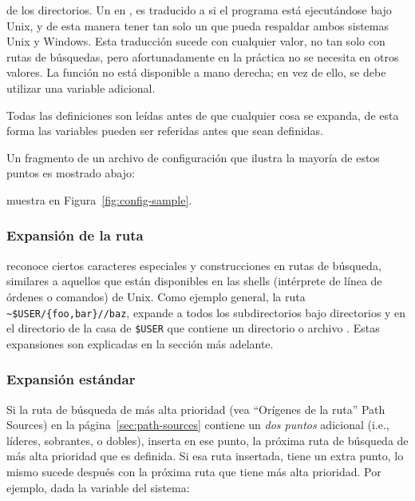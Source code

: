 \documentclass{article}
\begin{document}
\begin{itemize*}
			de los directorios.  Un \samp{;} en \var{:}, es
			traducido a \samp{:} si el programa está
			ejecutándose bajo Unix, y de esta manera tener
			tan solo un  que pueda respaldar
			ambos sistemas Unix y Windows. Esta traducción
			sucede con cualquier valor, no tan solo con
			rutas de búsquedas, pero afortunadamente en la
			práctica \samp{;} no se necesita en otros
			valores.  La función  no está disponible  a mano derecha;
			en vez de ello, se debe utilizar una variable
			adicional.  
		\item
			Todas las definiciones son leídas
			antes de que cualquier cosa se
			expanda, de esta forma las variables
			pueden ser referidas antes que sean
			definidas. 
	\end{itemize*}

	Un fragmento de un archivo de configuración que
	ilustra la mayoría de estos puntos es
	\ifSingleColumn
	mostrado abajo:

	
	\else
	muestra en Figura~\ref{fig:config-sample}.
	\fi

	\subsubsection{Expansión de la ruta}
	\label{sec:path-expansion}

	\KPS{} reconoce ciertos caracteres especiales y construcciones en rutas
	de búsqueda, similares a aquellos que están disponibles
	en las shells (intérprete de línea de órdenes o comandos) de Unix.
	Como ejemplo general, la ruta
	\verb+~$USER/{foo,bar}//baz+, expande a todos los
	subdirectorios bajo directorios  y 
	en el directorio de la casa de \texttt{\$USER} que
	contiene un directorio o archivo . Estas
	expansiones son explicadas en la sección más adelante.
	
	\subsubsection{Expansión estándar}
	\label{sec:default-expansion}

        Si la ruta de búsqueda de más alta prioridad (vea ``Orígenes
        de la ruta'' Path Sources) en la página~\ref{sec:path-sources}
        contiene un \emph{dos puntos} adicional (i.e., líderes,
        sobrantes, o dobles), \KPS{} inserta en ese punto, la próxima
        ruta de búsqueda de más alta prioridad que es definida. Si esa
        ruta insertada, tiene un extra punto, lo mismo sucede después con la
        próxima ruta que tiene más alta prioridad.  Por ejemplo, dada la
        variable del sistema:
\end{document}
